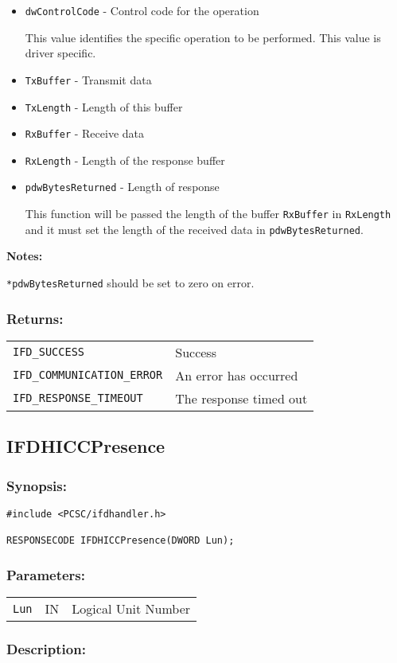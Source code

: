 \documentclass[a4paper,12pt]{article}
\newcommand{\synopsis}{\subsubsection{Synopsis:}}
\newcommand{\parameters}{\subsubsection{Parameters:}}
\newcommand{\desc}{\subsubsection{Description:}}
\newcommand{\returns}{\subsubsection{Returns:}}
\begin{document}
\begin{itemize}
\item \texttt{dwControlCode} - Control code for the operation

This value identifies the specific operation to be performed. This value
is driver specific.

\item \texttt{TxBuffer} - Transmit data
\item \texttt{TxLength} - Length of this buffer
\item \texttt{RxBuffer} - Receive data
\item \texttt{RxLength} - Length of the response buffer

\item \texttt{pdwBytesReturned} - Length of response

This function will be passed the length of the buffer \texttt{RxBuffer}
in \texttt{RxLength} and it must set the length of the received data in
\texttt{pdwBytesReturned}.

\end{itemize}

\textbf{Notes:}

\texttt{*pdwBytesReturned} should be set to zero on error.

\returns

\begin{tabular}{ll}
\texttt{IFD\_SUCCESS} & Success\\
\texttt{IFD\_COMMUNICATION\_ERROR} & An error has occurred\\
\texttt{IFD\_RESPONSE\_TIMEOUT} & The response timed out
\end{tabular}


\subsection{IFDHICCPresence}

\synopsis
\begin{verbatim}
#include <PCSC/ifdhandler.h>

RESPONSECODE IFDHICCPresence(DWORD Lun);
\end{verbatim}

\parameters

\begin{tabular}{lll}
\texttt{Lun} & IN & Logical Unit Number
\end{tabular}

\desc
\end{document}
